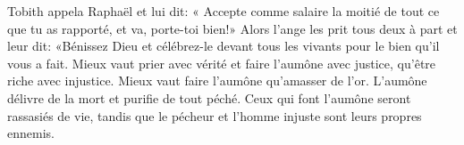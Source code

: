 Tobith appela Raphaël et lui dit:
	« Accepte comme salaire la moitié de tout ce que tu as rapporté,
	et va, porte-toi bien!»
Alors l’ange les prit tous deux à part et leur dit:
	«Bénissez Dieu et célébrez-le devant tous les vivants
		pour le bien qu’il vous a fait.
Mieux vaut prier avec vérité et faire l’aumône avec justice,
	qu’être riche avec injustice.
Mieux vaut faire l’aumône qu’amasser de l’or.
	L’aumône délivre de la mort et purifie de tout péché.
Ceux qui font l’aumône seront rassasiés de vie,
	tandis que le pécheur et l’homme injuste sont leurs propres ennemis.
